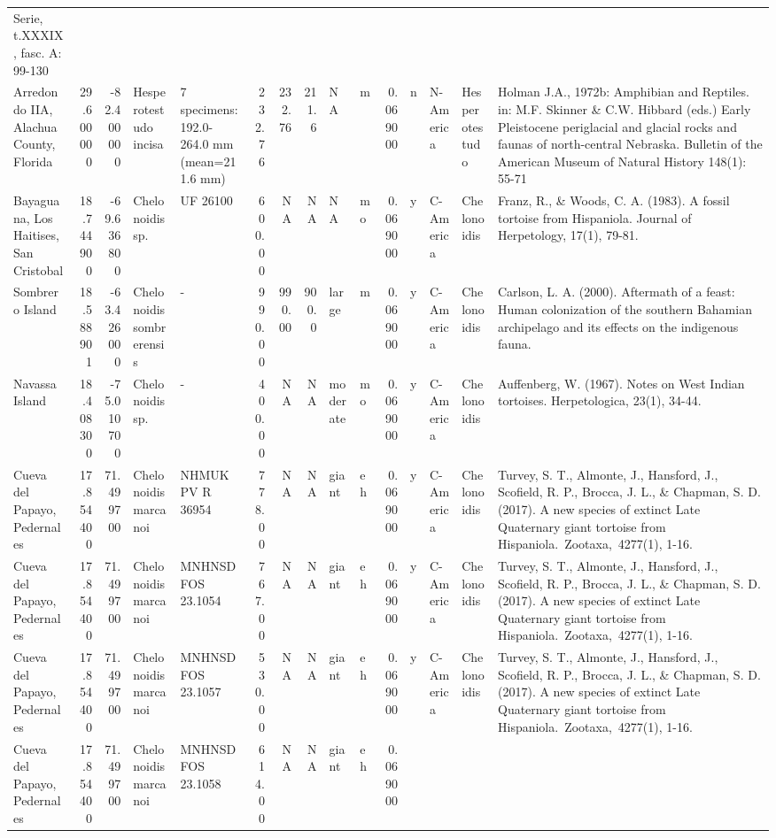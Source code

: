\documentclass[]{article}
\begin{document}
\begin{longtable}[]{@{}lrrllrrrllrllll@{}}
Serie, t.XXXIX, fasc. A: 99-130\tabularnewline
Arredondo IIA, Alachua County, Florida & 29.600000 & -82.400000 &
Hesperotestudo incisa & 7 specimens: 192.0-264.0 mm (mean=211.6 mm) &
232.76 & 232.76 & 211.6 & NA & m & 0.069000 & n & N-America &
Hesperotestudo & Holman J.A., 1972b: Amphibian and Reptiles. in: M.F.
Skinner \& C.W. Hibbard (eds.) Early Pleistocene periglacial and glacial
rocks and faunas of north-central Nebraska. Bulletin of the American
Museum of Natural History 148(1): 55-71\tabularnewline
Bayaguana, Los Haitises, San Cristobal & 18.744900 & -69.636800 &
Chelonoidis sp. & UF 26100 & 600.00 & NA & NA & NA & mo & 0.069000 & y &
C-America & Chelonoidis & Franz, R., \& Woods, C. A. (1983). A fossil
tortoise from Hispaniola. Journal of Herpetology, 17(1),
79-81.\tabularnewline
Sombrero Island & 18.588901 & -63.426000 & Chelonoidis sombrerensis & -
& 990.00 & 990.00 & 900.0 & large & m & 0.069000 & y & C-America &
Chelonoidis & Carlson, L. A. (2000). Aftermath of a feast: Human
colonization of the southern Bahamian archipelago and its effects on the
indigenous fauna.\tabularnewline
Navassa Island & 18.408300 & -75.010700 & Chelonoidis sp. & - & 400.00 &
NA & NA & moderate & mo & 0.069000 & y & C-America & Chelonoidis &
Auffenberg, W. (1967). Notes on West Indian tortoises. Herpetologica,
23(1), 34-44.\tabularnewline
Cueva del Papayo, Pedernales & 17.854400 & 71.499700 & Chelonoidis
marcanoi & NHMUK PV R 36954 & 778.00 & NA & NA & giant & eh & 0.069000 &
y & C-America & Chelonoidis & Turvey, S. T., Almonte, J., Hansford, J.,
Scofield, R. P., Brocca, J. L., \& Chapman, S. D. (2017). A new species
of extinct Late Quaternary giant tortoise from
Hispaniola.~Zootaxa,~4277(1), 1-16.\tabularnewline
Cueva del Papayo, Pedernales & 17.854400 & 71.499700 & Chelonoidis
marcanoi & MNHNSD FOS 23.1054 & 767.00 & NA & NA & giant & eh & 0.069000
& y & C-America & Chelonoidis & Turvey, S. T., Almonte, J., Hansford,
J., Scofield, R. P., Brocca, J. L., \& Chapman, S. D. (2017). A new
species of extinct Late Quaternary giant tortoise from
Hispaniola.~Zootaxa,~4277(1), 1-16.\tabularnewline
Cueva del Papayo, Pedernales & 17.854400 & 71.499700 & Chelonoidis
marcanoi & MNHNSD FOS 23.1057 & 530.00 & NA & NA & giant & eh & 0.069000
& y & C-America & Chelonoidis & Turvey, S. T., Almonte, J., Hansford,
J., Scofield, R. P., Brocca, J. L., \& Chapman, S. D. (2017). A new
species of extinct Late Quaternary giant tortoise from
Hispaniola.~Zootaxa,~4277(1), 1-16.\tabularnewline
Cueva del Papayo, Pedernales & 17.854400 & 71.499700 & Chelonoidis
marcanoi & MNHNSD FOS 23.1058 & 614.00 & NA & NA & giant & eh & 0.069000

\end{longtable}
\end{document}
